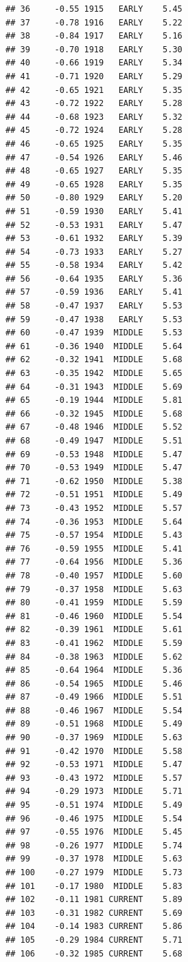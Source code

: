 \documentclass{article}\usepackage[]{graphicx}\usepackage[]{xcolor}
\makeatletter
\newenvironment{kframe}{%
 \def\at@end@of@kframe{}%
 \ifinner\ifhmode%
  \def\at@end@of@kframe{\end{minipage}}%
  \begin{minipage}{\columnwidth}%
 \fi\fi%
 \def\FrameCommand##1{\hskip\@totalleftmargin \hskip-\fboxsep
 \colorbox{shadecolor}{##1}\hskip-\fboxsep
     \hskip-\linewidth \hskip-\@totalleftmargin \hskip\columnwidth}%
 \MakeFramed {\advance\hsize-\width
   \@totalleftmargin\z@ \linewidth\hsize
   \@setminipage}}%
 {\par\unskip\endMakeFramed%
 \at@end@of@kframe}
\newenvironment{knitrout}{}{} %
\makeatother
\begin{document}
\begin{knitrout}
\begin{kframe}
\begin{verbatim}
## 36     -0.55 1915   EARLY    5.45
## 37     -0.78 1916   EARLY    5.22
## 38     -0.84 1917   EARLY    5.16
## 39     -0.70 1918   EARLY    5.30
## 40     -0.66 1919   EARLY    5.34
## 41     -0.71 1920   EARLY    5.29
## 42     -0.65 1921   EARLY    5.35
## 43     -0.72 1922   EARLY    5.28
## 44     -0.68 1923   EARLY    5.32
## 45     -0.72 1924   EARLY    5.28
## 46     -0.65 1925   EARLY    5.35
## 47     -0.54 1926   EARLY    5.46
## 48     -0.65 1927   EARLY    5.35
## 49     -0.65 1928   EARLY    5.35
## 50     -0.80 1929   EARLY    5.20
## 51     -0.59 1930   EARLY    5.41
## 52     -0.53 1931   EARLY    5.47
## 53     -0.61 1932   EARLY    5.39
## 54     -0.73 1933   EARLY    5.27
## 55     -0.58 1934   EARLY    5.42
## 56     -0.64 1935   EARLY    5.36
## 57     -0.59 1936   EARLY    5.41
## 58     -0.47 1937   EARLY    5.53
## 59     -0.47 1938   EARLY    5.53
## 60     -0.47 1939  MIDDLE    5.53
## 61     -0.36 1940  MIDDLE    5.64
## 62     -0.32 1941  MIDDLE    5.68
## 63     -0.35 1942  MIDDLE    5.65
## 64     -0.31 1943  MIDDLE    5.69
## 65     -0.19 1944  MIDDLE    5.81
## 66     -0.32 1945  MIDDLE    5.68
## 67     -0.48 1946  MIDDLE    5.52
## 68     -0.49 1947  MIDDLE    5.51
## 69     -0.53 1948  MIDDLE    5.47
## 70     -0.53 1949  MIDDLE    5.47
## 71     -0.62 1950  MIDDLE    5.38
## 72     -0.51 1951  MIDDLE    5.49
## 73     -0.43 1952  MIDDLE    5.57
## 74     -0.36 1953  MIDDLE    5.64
## 75     -0.57 1954  MIDDLE    5.43
## 76     -0.59 1955  MIDDLE    5.41
## 77     -0.64 1956  MIDDLE    5.36
## 78     -0.40 1957  MIDDLE    5.60
## 79     -0.37 1958  MIDDLE    5.63
## 80     -0.41 1959  MIDDLE    5.59
## 81     -0.46 1960  MIDDLE    5.54
## 82     -0.39 1961  MIDDLE    5.61
## 83     -0.41 1962  MIDDLE    5.59
## 84     -0.38 1963  MIDDLE    5.62
## 85     -0.64 1964  MIDDLE    5.36
## 86     -0.54 1965  MIDDLE    5.46
## 87     -0.49 1966  MIDDLE    5.51
## 88     -0.46 1967  MIDDLE    5.54
## 89     -0.51 1968  MIDDLE    5.49
## 90     -0.37 1969  MIDDLE    5.63
## 91     -0.42 1970  MIDDLE    5.58
## 92     -0.53 1971  MIDDLE    5.47
## 93     -0.43 1972  MIDDLE    5.57
## 94     -0.29 1973  MIDDLE    5.71
## 95     -0.51 1974  MIDDLE    5.49
## 96     -0.46 1975  MIDDLE    5.54
## 97     -0.55 1976  MIDDLE    5.45
## 98     -0.26 1977  MIDDLE    5.74
## 99     -0.37 1978  MIDDLE    5.63
## 100    -0.27 1979  MIDDLE    5.73
## 101    -0.17 1980  MIDDLE    5.83
## 102    -0.11 1981 CURRENT    5.89
## 103    -0.31 1982 CURRENT    5.69
## 104    -0.14 1983 CURRENT    5.86
## 105    -0.29 1984 CURRENT    5.71
## 106    -0.32 1985 CURRENT    5.68

\end{verbatim}
\end{kframe}
\end{knitrout}
\end{document}
